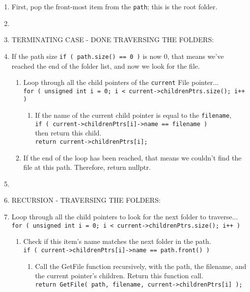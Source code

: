 \documentclass[a4paper,12pt,oneside]{book}
\begin{document}
\begin{enumerate}
    \item   First, pop the front-most item from the \texttt{path}; this is the root folder.


    \item[]
    \item[] TERMINATING CASE - DONE TRAVERSING THE FOLDERS:
    \item   If the path size \texttt{if ( path.size() == 0 )} is now 0,
            that means we've reached the end of the folder list, and now we look for the file.
            
    \begin{enumerate}
        \item   Loop through all the child pointers of the \texttt{current} File pointer... \\
            \footnotesize 
                \texttt{for ( unsigned int i = 0; i < current->childrenPtrs.size(); i++ )}
            \normalsize 
                
        \begin{enumerate}
            \item   If the name of the current child pointer is equal to the \texttt{filename}, \\
                \texttt{if ( current->childrenPtrs[i]->name == filename )} \\
                then return this child. \\ \texttt{return current->childrenPtrs[i];}
        \end{enumerate}
        \item   If the end of the loop has been reached, that means we couldn't find the file at this path.
                Therefore, return nullptr.
    \end{enumerate}
    
    \item[]
    \item[] RECURSION - TRAVERSING THE FOLDERS:
    \item   Loop through all the child pointers to look for the next folder to traverse... \\
            \footnotesize 
            \texttt{for ( unsigned int i = 0; i < current->childrenPtrs.size(); i++ )}
            \normalsize 
    \begin{enumerate}
        \item   Check if this item's name matches the next folder in the path. \\
                \texttt{if ( current->childrenPtrs[i]->name == path.front() )}
            \begin{enumerate}
                \item   Call the GetFile function recursively, with the path, the filename,
                        and the current pointer's children. Return this function call. \\
                        \footnotesize 
                        \texttt{return GetFile( path, filename, current->childrenPtrs[i] );}
                        \normalsize 
            \end{enumerate}
    \end{enumerate}


\end{enumerate}
\end{document}
